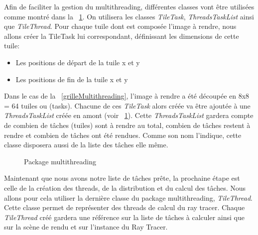 \documentclass[11pt]{article}
\begin{document}
Afin de faciliter la gestion du multithreading, différentes classes vont être utilisées comme montré dans la \figurename\ \ref{packageMultithreading}. On utilisera les classes \textit{TileTask}, \textit{ThreadsTaskList} ainsi que \textit{TileThread}. Pour chaque tuile dont est composée l'image à rendre, nous allons créer la TileTask lui correspondant, définissant les dimensions de cette tuile:
\begin{itemize}
	\item {Les positions de départ de la tuile x et y}
	\item {Les positions de fin de la tuile x et y}
\end{itemize}
Dans le cas de la \figurename\ \ref{grilleMultithreading}, l'image à rendre a été découpée en 8x8 = 64 tuiles ou (tasks). Chacune de ces \textit{TileTask} alors créée va être ajoutée à une \textit{ThreadsTaskList} créée en amont (voir \figurename\ \ref{packageMultithreading}). Cette \textit{ThreadsTaskList} gardera compte de combien de tâches (tuiles) sont à rendre au total, combien de tâches restent à rendre et combien de tâches ont été rendues. Comme son nom l'indique, cette classe disposera aussi de la liste des tâches elle même.

\begin{figure}[h!]

	\caption{Package multithreading}
	\label{packageMultithreading}
\end{figure}
\FloatBarrier

Maintenant que nous avons notre liste de tâches prête, la prochaine étape est celle de la création des threads, de la distribution et du calcul des tâches. Nous allons pour cela utiliser la dernière classe du package multithreading, \textit{TileThread}. Cette classe permet de représenter des threads de calcul du ray tracer. Chaque \textit{TileThread} créé gardera une référence sur la liste de tâches à calculer ainsi que sur la scène de rendu et sur l'instance du Ray Tracer.
\end{document}
